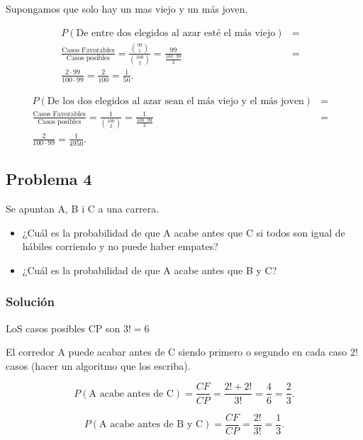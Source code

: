 \documentclass[
]{article}
\providecommand{\tightlist}{%
  \setlength{\itemsep}{0pt}\setlength{\parskip}{0pt}}
\begin{document}
Supongamos que solo hay un mas viejo y un más joven.

\begin{eqnarray*}
P(\mbox{De entre dos elegidos al azar esté el más viejo}) &=&\\
\frac{\mbox{Casos Favorables}}{\mbox{Casos posibles}}=
\frac{{{99}\choose {1}}}{{{100}\choose {2}}}=\frac{99}{\frac{100\cdot 99}{2}}&=&\\
\frac{2\cdot 99}{100\cdot 99}=
\frac{2}{100}=\frac{1}{50}.
\end{eqnarray*}

\begin{eqnarray*}
P(\mbox{De los dos elegidos al azar sean  el más viejo y el más joven})&=&\\
\frac{\mbox{Casos Favorables}}{\mbox{Casos posibles}}=
\frac{1}{{{100} \choose {2}}}=\frac{1}{\frac{100\cdot 99}{2}}&=&\\
\frac{2}{100\cdot 99}
=\frac{1}{4950}.
\end{eqnarray*}

\hypertarget{problema-4}{%
\subsection{Problema 4}\label{problema-4}}

Se apuntan A, B i C a una carrera.

\begin{itemize}
\tightlist
\item
  ¿Cuál es la probabilidad de que A acabe antes que C si todos son igual
  de hábiles corriendo y no puede haber empates?
\item
  ¿Cuál es la probabilidad de que A acabe antes que B y C?
\end{itemize}

\hypertarget{soluciuxf3n-4}{%
\subsubsection{Solución}\label{soluciuxf3n-4}}

LoS casos posibles CP son \(3!=6\)

El corredor A puede acabar antes de C siendo primero o segundo en cada
caso \(2!\) casos (hacer un algoritmo que los escriba).

\[P(\mbox{A acabe antes de C})=\frac{CF}{CP}=\frac{2!+2!}{3!}=\frac{4}{6}=\frac{2}{3}.\]

\[P(\mbox{A acabe antes de B y C})=\frac{CF}{CP}=\frac{2!}{3!}=\frac{1}{3}.\]
\end{document}
